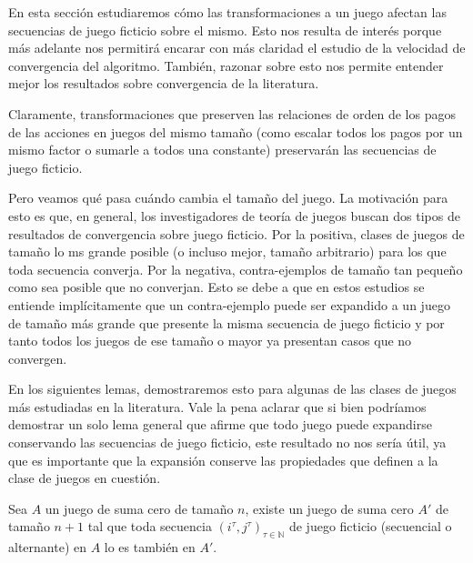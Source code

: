 En esta sección estudiaremos cómo las transformaciones a un juego afectan las secuencias de juego ficticio sobre el mismo. Esto nos resulta de interés porque más adelante nos permitirá encarar con más claridad el estudio de la velocidad de convergencia del algoritmo. También, razonar sobre esto nos permite entender mejor los resultados sobre convergencia de la literatura.

Claramente, transformaciones que preserven las relaciones de orden de los pagos de las acciones en juegos del mismo tamaño (como escalar todos los pagos por un mismo factor o sumarle a todos una constante) preservarán las secuencias de juego ficticio.

Pero veamos qué pasa cuándo cambia el tamaño del juego. La motivación para esto es que, en general, los investigadores de teoría de juegos buscan dos tipos de resultados de convergencia sobre juego ficticio. Por la positiva, clases de juegos de tamaño lo ms grande posible (o incluso mejor, tamaño arbitrario) para los que toda secuencia converja. Por la negativa, contra-ejemplos de tamaño tan pequeño como sea posible que no converjan. Esto se debe a que en estos estudios se entiende implícitamente que un contra-ejemplo puede ser expandido a un juego de tamaño más grande que presente la misma secuencia de juego ficticio y por tanto todos los juegos de ese tamaño o mayor ya presentan casos que no convergen.

En los siguientes lemas, demostraremos esto para algunas de las clases de juegos más estudiadas en la literatura. Vale la pena aclarar que si bien podríamos demostrar un solo lema general que afirme que todo juego puede expandirse conservando las secuencias de juego ficticio, este resultado no nos sería útil, ya que es importante que la expansión conserve las propiedades que definen a la clase de juegos en cuestión.

\begin{lemma}
    Sea $A$ un juego de suma cero de tamaño $n$, existe un juego  de suma cero $A'$ de tamaño $n+1$ tal que toda secuencia $(i^\tau, j^\tau)_{\tau \in \mathbb{N}}$ de juego ficticio (secuencial o alternante) en $A$ lo es también en $A'$.
\end{lemma}

